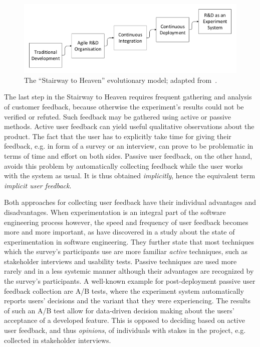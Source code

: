 \begin{figure}[ht]
        \includegraphics[width=\textwidth]{gfx/stairway.pdf}
        \caption{The ``Stairway to Heaven'' evolutionary model; adapted from~\cite{Olsson2012}.}
        \label{fig:stairway}
\end{figure}

The last step in the Stairway to Heaven requires frequent gathering and analysis of customer feedback, because otherwise the experiment's results could not be verified or refuted.
Such feedback may be gathered using active or passive methods.
Active user feedback can yield useful qualitative observations about the product.
The fact that the user has to explicitly take time for giving their feedback, e.g. in form of a survey or an interview, can prove to be problematic in terms of time and effort on both sides.
Passive user feedback, on the other hand, avoids this problem by automatically collecting feedback while the user works with the system as usual.
It is thus obtained \emph{implicitly}, hence the equivalent term \emph{implicit user feedback}.

Both approaches for collecting user feedback have their individual advantages and disadvantages.
When experimentation is an integral part of the software engineering process however, the speed and frequency of user feedback becomes more and more important, as \citet{lindgren2015software} have discovered in a study about the state of experimentation in software engineering.
They further state that most techniques which the survey's participants use are more familiar \emph{active} techniques, such as stakeholder interviews and usability tests.
Passive techniques are used more rarely and in a less systemic manner although their advantages are recognized by the survey's participants.
A well-known example for post-deployment passive user feedback collection are A/B tests, where the experiment system automatically reports users' decisions and the variant that they were experiencing.
The results of such an A/B test allow for data-driven decision making about the users' acceptance of a developed feature.
This is opposed to deciding based on active user feedback, and thus \emph{opinions}, of individuals with stakes in the project, e.g. collected in stakeholder interviews.

